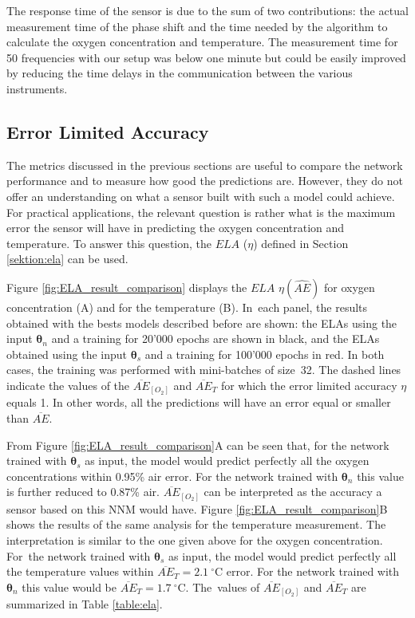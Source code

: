 \documentclass[sensors,article,accept,moreauthors,pdftex,10pt,a4paper]{Definitions/mdpi}
\theoremstyle{definition}
\begin{document}
The response time of the sensor is due to the sum of two contributions: the actual measurement time of the phase shift and the time needed by the algorithm to calculate the oxygen concentration and temperature. The measurement time for 50 frequencies with our setup was below one minute but could be easily improved by reducing the time delays in the communication between the various instruments.

\subsection{Error Limited Accuracy}

The metrics discussed in the previous sections are useful to compare the network performance and to measure how good the predictions are. However, they do not offer an understanding on what a sensor built with such a model could achieve. For practical applications, the relevant question is rather what is the maximum error  the sensor will have in predicting the oxygen concentration and temperature. To answer this question, the $ELA$ ($\eta$) defined in Section \ref{sektion:ela} can be used. 

Figure \ref{fig:ELA_result_comparison} displays the $ELA$ $\eta(\widehat {AE})$ for oxygen concentration (A) and for the temperature (B). In~each panel, the results obtained with the bests models described before are shown: the ELAs using the input ${\pmb \theta}_n$ and a training for 20'000 epochs are shown in black, and the ELAs obtained using the input ${\pmb \theta}_s$ and a training for 100'000 epochs in red. In both cases, the training was performed with mini-batches of size~32.
The dashed lines indicate the values of the $\overline{AE}_{[O_2]}$ and $\overline{AE}_{T}$ for which the error limited accuracy $\eta$ equals 1. In other words, all the predictions will have an error equal or smaller than $\overline{AE}$.



From Figure \ref{fig:ELA_result_comparison}A can be seen that, for the network trained with ${\pmb \theta}_s$ as input, the model would predict perfectly all the oxygen concentrations within 0.95\% air error. For the network trained with ${\pmb \theta}_n$ this value is further reduced to 0.87\% air. $\overline{AE}_{[O_2]}$ can be interpreted as the accuracy a sensor based on this NNM would have.
Figure \ref{fig:ELA_result_comparison}B shows the results of the same analysis for the temperature measurement. The interpretation is similar to the one given above for the oxygen concentration. For~the network trained with ${\pmb \theta}_s$ as input, the model would predict perfectly all the temperature values within $\overline{AE}_{T}=2.1 \ ^\circ$C error. For the network trained with ${\pmb \theta}_n$ this value would be  $\overline{AE}_{T}=1.7 \ ^\circ$C. The~values of $\overline{AE}_{[O_2]}$ and $\overline{AE}_{T}$ are summarized in Table \ref{table:ela}.
\end{document}
